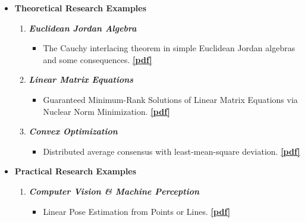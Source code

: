 \documentclass[12pt]{article}
\numberwithin{equation}{section}
\numberwithin{table}{section}
\numberwithin{figure}{section}
\begin{document}
\begin{itemize}
	\item{\textbf{Theoretical Research Examples}}
		\begin{enumerate}
			\item{\textit{\textbf{Euclidean Jordan Algebra}}}
			\begin{itemize}
					\item{The Cauchy interlacing theorem in simple Euclidean Jordan algebras and some consequences.}
					\href{http://www.math.umbc.edu/~gowda/tech-reports/trGOW08-02.pdf}{\textbf{[pdf]}}
			\end{itemize}
			
			\item{\textit{\textbf{Linear Matrix Equations}}}
			\begin{itemize}
				\item{Guaranteed Minimum-Rank Solutions of Linear Matrix Equations via Nuclear Norm Minimization.}
				\href{https://arxiv.org/pdf/0706.4138.pdf}{\textbf{[pdf]}}
						\end{itemize}
			\item{\textit{\textbf{Convex Optimization}}}
			\begin{itemize}
				\item{Distributed average consensus with least-mean-square deviation.}
				\href{https://www.sciencedirect.com/science/article/pii/S0743731506001808}{\textbf{[pdf]}}
			\end{itemize}
		\end{enumerate}

	\item{\textbf{Practical Research Examples}}
		\begin{enumerate}
			\item{\textit{\textbf{Computer Vision \& Machine Perception}}}
			\begin{itemize}
				\item{Linear Pose Estimation from Points or Lines.}
				\href{https://repository.upenn.edu/cgi/viewcontent.cgi?article=1018&context=cis_papers}{\textbf{[pdf]}}
			\end{itemize}
			

\end{enumerate}
\end{itemize}
\end{document}
